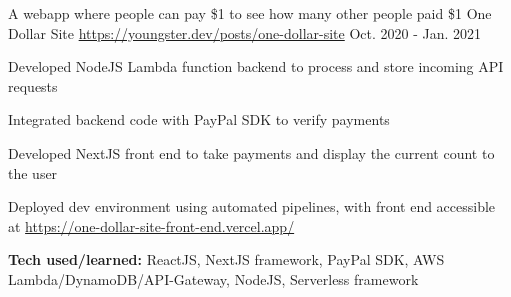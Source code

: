 \begin{cventries}
    \vspace{-.25em}
    \cventry
    {A webapp where people can pay \$1 to see how many other people paid \$1} %
    {One Dollar Site} %
    {\href{https://youngster.dev/posts/one-dollar-site}{https://youngster.dev/posts/one-dollar-site}} %
    {Oct. 2020 - Jan. 2021} %
    { %
        \begin{cvitems}
            \item {Developed NodeJS Lambda function backend to process and store incoming API requests}
            \item {Integrated backend code with PayPal SDK to verify payments}
            \item {Developed NextJS front end to take payments and display the current count to the user}
            \item {Deployed dev environment using automated pipelines, with front end accessible at \href{https://one-dollar-site-front-end.vercel.app/}{https://one-dollar-site-front-end.vercel.app/}}
            \item {\textbf{Tech used/learned:} ReactJS, NextJS framework, PayPal SDK, AWS Lambda/DynamoDB/API-Gateway, NodeJS, Serverless framework}
        \end{cvitems}
    }




\end{cventries}
